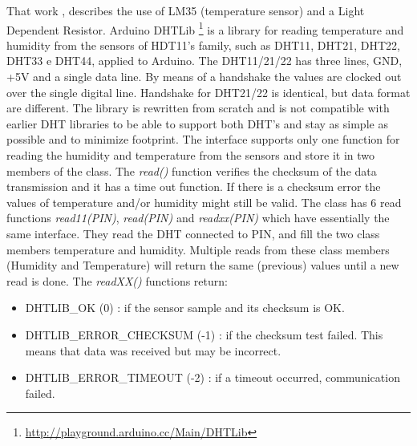 \documentclass{acm_proc_article-sp}
\begin{document}
That work \cite{dearduino}, describes the use of LM35 (temperature sensor) and a Light Dependent Resistor.
\newline
\newline
Arduino DHTLib \footnote{\url{http://playground.arduino.cc/Main/DHTLib}} is a library for reading temperature and humidity from the sensors of HDT11's family, such as DHT11, DHT21, DHT22, DHT33 e DHT44, applied to Arduino. 
\newline
\newline
The DHT11/21/22 has three lines, GND, +5V and a single data line. By means of a handshake the values are clocked out over the single digital line. Handshake for DHT21/22 is identical, but data format are different. The library is rewritten from scratch and is not compatible with earlier DHT libraries to be able to support both DHT's and stay as simple as possible and to minimize footprint.
\newline
\newline
The interface supports only one function for reading the humidity and temperature from the sensors and store it in two members of the class. The \textit{read()} function verifies the checksum of the data transmission and it has a time out function. If there is a checksum error the values of temperature and/or humidity might still be valid.
\newline
\newline
The class has 6 read functions \textit{read11(PIN)}, \textit{read(PIN)} and \textit{readxx(PIN)} which have essentially the same interface. They read the DHT connected to PIN, and fill the two class members temperature and humidity. Multiple reads from these class members (Humidity and Temperature) will return the same (previous) values until a new read is done.
\newline
\newline
The \textit{readXX()} functions return:

\begin{itemize}
\item DHTLIB\_OK (0) : if the sensor sample and its checksum is OK.
\item DHTLIB\_ERROR\_CHECKSUM (-1) : if the checksum test failed. This means that data was received but may be incorrect.
\item DHTLIB\_ERROR\_TIMEOUT (-2) : if a timeout occurred, communication failed.
\end{itemize}
\end{document}
